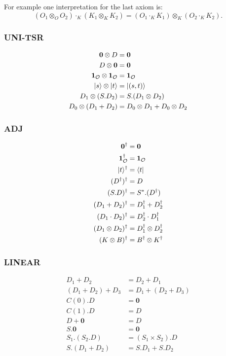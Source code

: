 For example one interpretation for the last axiom is: 
$$
(O_1 \otimes_O O_2) \cdot_K (K_1 \otimes_K K_2) = (O_1 \cdot_K K_1) \otimes_K (O_2 \cdot_K K_2).
$$

\subsubsection*{\textsf{UNI-TSR}}
\begin{align*}
    \mathbf{0} \otimes D & = \mathbf{0} \\
    D \otimes \mathbf{0} & = \mathbf{0} \\
    \mathbf{1}_\mathcal{O} \otimes \mathbf{1}_\mathcal{O} & = \mathbf{1}_\mathcal{O} \\
    |s\rangle \otimes |t\rangle& =|(s, t)\rangle \\
    D_1 \otimes (S.D_2) & = S.(D_1 \otimes D_2) \\
    D_0 \otimes (D_1 + D_2) & = D_0 \otimes D_1 + D_0 \otimes D_2
\end{align*}

  
\subsubsection*{\textsf{ADJ}}
\begin{align*}
    \textbf{0}^\dagger & = \textbf{0} \\
    \mathbf{1}_\mathcal{O}^\dagger & = \mathbf{1}_\mathcal{O}\\
    |t\rangle^\dagger & = \langle t|\\
    (D^\dagger)^\dagger & = D \\
    (S.D)^\dagger & = S^*.(D^\dagger) \\
    (D_1 + D_2)^\dagger & = D_1^\dagger + D_2^\dagger\\
    (D_1 \cdot D_2)^\dagger & = D_2^\dagger \cdot D_1^\dagger \\
    (D_1 \otimes D_2)^\dagger & = D_1^\dagger \otimes D_2^\dagger \\
    (K \otimes B)^\dagger & = B^\dagger \otimes K^\dagger
\end{align*}

\subsubsection*{\textsf{LINEAR}}
\begin{align*}
    D_1 + D_2 & = D_2 + D_1 \\
    (D_1 + D_2) + D_3 & = D_1 + (D_2 + D_3) \\
    C(0).D & = \mathbf{0} \\
    C(1).D & = D \\
    D + \mathbf{0} & = D \\
    S.\mathbf{0} & = \mathbf{0} \\
    S_1.(S_2.D) & = (S_1 \times S_2).D \\
    S.(D_1 + D_2) & = S.D_1 + S.D_2 \\
\end{align*}


